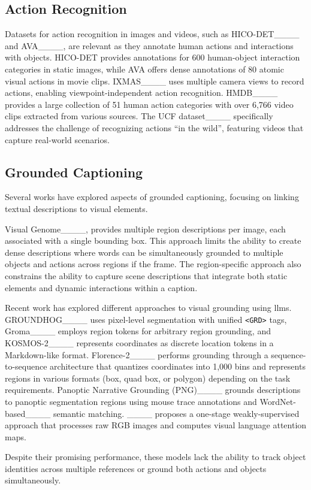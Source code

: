     \subsection{Action Recognition}\label{subsec:action-recognition}

    Datasets for action recognition in images and videos, such as HICO-DET____ and AVA____,
    are relevant as they annotate human actions and interactions with objects.
    HICO-DET provides annotations for 600 human-object interaction categories in static images, while AVA offers
    dense annotations of 80 atomic visual actions in movie clips.
    IXMAS____ uses multiple camera views to
    record actions, enabling viewpoint-independent action recognition.
    HMDB____ provides a large collection of 51 human action categories with
    over 6,766 video clips extracted from various sources.
    The UCF dataset____ specifically addresses the challenge of recognizing actions ``in the wild'',
    featuring videos that capture real-world scenarios.

    \subsection{Grounded Captioning}\label{subsec:grounded-captioning}
    Several works have explored aspects of grounded captioning, focusing on linking textual descriptions to visual elements.

    Visual Genome____, provides multiple region descriptions per image, each associated with a single bounding box.
    This approach limits the ability to create dense descriptions where words can be simultaneously grounded to multiple objects and actions across regions if the frame.
    The region-specific approach also constrains the ability to capture scene descriptions that integrate both static elements and dynamic interactions within a caption.

    Recent work has explored different approaches to visual grounding using \glspl{llm}.
    GROUNDHOG____ uses pixel-level segmentation with unified \texttt{<GRD>} tags,
    Groma____ employs region tokens for arbitrary region grounding,
    and KOSMOS-2____ represents coordinates as discrete location tokens in a Markdown-like format.
    Florence-2____ performs grounding through a sequence-to-sequence architecture that quantizes
    coordinates into 1,000 bins and represents regions in various formats (box, quad box, or polygon) depending on the task
    requirements.
    Panoptic Narrative Grounding (PNG)____ grounds descriptions to panoptic segmentation regions
    using mouse trace annotations and WordNet-based____ semantic matching.
    ____ proposes a one-stage weakly-supervised approach that processes raw RGB images and computes visual language attention maps.

    Despite their promising performance, these models lack the ability to track object identities across multiple references
    or ground both actions and objects simultaneously.